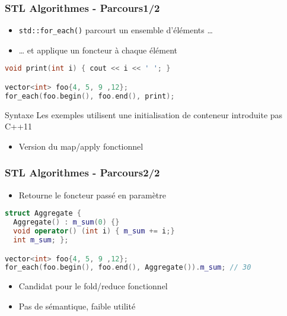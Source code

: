 \documentclass[C++.tex]{subfiles}
\begin{document}
\begin{frame}[fragile]
	\frametitle{STL Algorithmes - Parcours\titlehfill{}1/2}
	\begin{itemize}
		\item \lstinline|std::for_each()| parcourt un ensemble d'éléments \ldots
		\item \ldots{} et applique un foncteur à chaque élément
	\end{itemize}

	\begin{lstlisting}[language=C++]
void print(int i) { cout << i << ' '; }

vector<int> foo{4, 5, 9 ,12};
for_each(foo.begin(), foo.end(), print);\end{lstlisting}

	\begin{alertblock}{Syntaxe}
		Les exemples utilisent une initialisation de conteneur introduite pas C++11
	\end{alertblock}

	\begin{itemize}
		\item Version du map/apply fonctionnel
	\end{itemize}
\end{frame}

\begin{frame}[fragile]
	\frametitle{STL Algorithmes - Parcours\titlehfill{}2/2}
	\begin{itemize}
		\item Retourne le foncteur passé en paramètre
	\end{itemize}

	\begin{lstlisting}[language=C++]
struct Aggregate {
  Aggregate() : m_sum(0) {}
  void operator() (int i) { m_sum += i;}
  int m_sum; };

vector<int> foo{4, 5, 9 ,12};
for_each(foo.begin(), foo.end(), Aggregate()).m_sum; // 30\end{lstlisting}

	\begin{itemize}
		\item Candidat pour le fold/reduce fonctionnel
		\item Pas de sémantique, faible utilité

	\end{itemize}
\end{frame}
\end{document}
